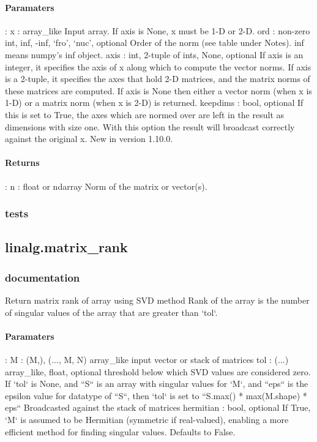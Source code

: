 \documentclass[a4paper,11pt]{article}
\begin{document}
\paragraph{Paramaters}: 
x : array\_like
Input array. If axis is None, x must be 1-D or 2-D.
ord : {non-zero int, inf, -inf, ‘fro’, ‘nuc’}, optional
Order of the norm (see table under Notes). inf means numpy’s inf object.
axis : {int, 2-tuple of ints, None}, optional
If axis is an integer, it specifies the axis of x along which to compute the vector norms. If axis is a 2-tuple, it specifies the axes that hold 2-D matrices, and the matrix norms of these matrices are computed. If axis is None then either a vector norm (when x is 1-D) or a matrix norm (when x is 2-D) is returned.
keepdims : bool, optional
If this is set to True, the axes which are normed over are left in the result as dimensions with size one. With this option the result will broadcast correctly against the original x.
New in version 1.10.0.\\

\paragraph{Returns}:    
n : float or ndarray
Norm of the matrix or vector(s).\\

\subsubsection{tests}


\subsection{linalg.matrix\_rank}
\subsubsection{documentation}
Return matrix rank of array using SVD method
Rank of the array is the number of singular values of the array that are
greater than `tol`.
\paragraph{Paramaters}:  M : {(M,), (..., M, N)} array\_like input vector or stack of matrices
tol : (...) array\_like, float, optional
threshold below which SVD values are considered zero. If `tol` is None, and ``S`` is an array with singular values for `M`, and ``eps`` is the epsilon value for datatype of ``S``, then `tol` is set to ``S.max() * max(M.shape) * eps`` Broadcasted against the stack of matrices hermitian : bool, optional If True, `M` is assumed to be Hermitian (symmetric if real-valued),
enabling a more efficient method for finding singular values. Defaults to False.
\end{document}
